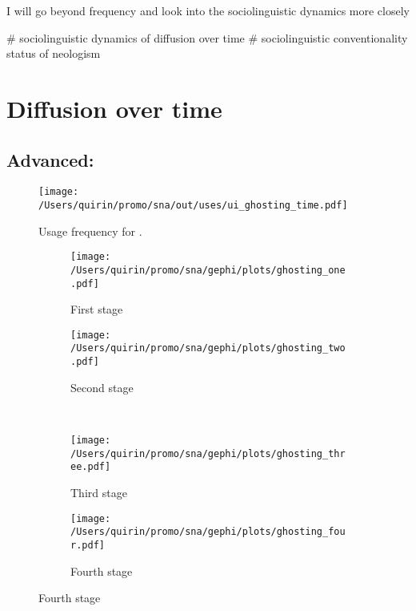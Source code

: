 \documentclass[
  a4paper,
  ]{scrartcl}
\begin{document}
      I will go beyond frequency and look into the sociolinguistic dynamics more closely

      \begin{easylist}[itemize]
        # sociolinguistic dynamics of diffusion over time
        # sociolinguistic conventionality status of neologism
      \end{easylist}

\section{Diffusion over time}

  \subsection{Advanced: }

    \begin{figure}[H]
      \caption{Usage frequency for .}
      \centering
      \texttt{[image: /Users/quirin/promo/sna/out/uses/ui\_ghosting\_time.pdf]}
    \end{figure}

    \begin{figure}[H]
      \caption{Social network of diffusion for  over time.}
      \centering
      \begin{subfigure}{.45\linewidth}
        \caption{First stage}
        \centering
        \texttt{[image: /Users/quirin/promo/sna/gephi/plots/ghosting\_one.pdf]}
      \end{subfigure}
      \begin{subfigure}{.45\linewidth}
        \caption{Second stage}
        \centering
        \texttt{[image: /Users/quirin/promo/sna/gephi/plots/ghosting\_two.pdf]}
      \end{subfigure}\\
      \begin{subfigure}{.45\linewidth}
        \caption{Third stage}
        \centering
        \texttt{[image: /Users/quirin/promo/sna/gephi/plots/ghosting\_three.pdf]}
      \end{subfigure}
      \begin{subfigure}{.45\linewidth}
        \caption{Fourth stage}
        \centering
        \texttt{[image: /Users/quirin/promo/sna/gephi/plots/ghosting\_four.pdf]}
      \end{subfigure}
    \end{figure}
\end{document}
